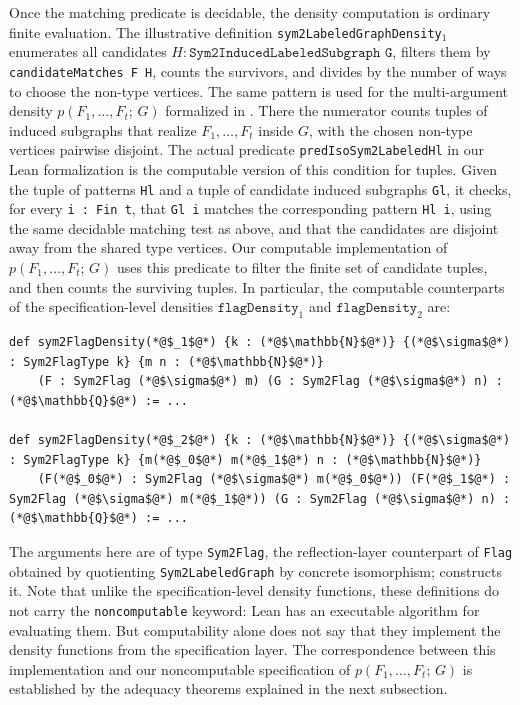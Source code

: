 \documentclass{article}
\newcommand{\den}[2]{p(#1;\,#2)}
\newcommand{\lean}[1]{\texttt{#1}}
\begin{document}
Once the matching predicate is decidable, the density computation is ordinary
finite evaluation.  The illustrative definition
\lean{sym2LabeledGraphDensity}$_1$
enumerates all candidates \(H : \lean{Sym2InducedLabeledSubgraph G}\), filters
them by \lean{candidateMatches F H}, counts the survivors, and divides by the
number of ways to choose the non-type vertices.  The same pattern is used for
the multi-argument density \(\den{F_1,\ldots,F_t}{G}\) formalized in
.  There the numerator counts tuples of
induced subgraphs that realize \(F_1,\ldots,F_t\) inside \(G\), with the
chosen non-type vertices pairwise disjoint.  The actual predicate
\lean{predIsoSym2LabeledHl} in our Lean formalization is the computable version of this
condition for tuples.  Given the tuple of patterns \lean{Hl}
and a tuple of candidate induced subgraphs \lean{Gl}, it checks, for every
\lean{i : Fin t}, that \lean{Gl i} matches the corresponding pattern
\lean{Hl i}, using the same decidable matching test as above, and that the
candidates are disjoint away from the shared type vertices.  Our
computable implementation of \(\den{F_1,\ldots,F_t}{G}\) uses this
predicate to filter the finite set of candidate tuples, and then counts the
surviving tuples.  In particular, the computable counterparts
of the specification-level densities \(\mathtt{flagDensity}_1\) and
\(\mathtt{flagDensity}_2\) are:
\begin{lstlisting}
def sym2FlagDensity(*@$_1$@*) {k : (*@$\mathbb{N}$@*)} {(*@$\sigma$@*) : Sym2FlagType k} {m n : (*@$\mathbb{N}$@*)}
    (F : Sym2Flag (*@$\sigma$@*) m) (G : Sym2Flag (*@$\sigma$@*) n) : (*@$\mathbb{Q}$@*) := ...

def sym2FlagDensity(*@$_2$@*) {k : (*@$\mathbb{N}$@*)} {(*@$\sigma$@*) : Sym2FlagType k} {m(*@$_0$@*) m(*@$_1$@*) n : (*@$\mathbb{N}$@*)}
    (F(*@$_0$@*) : Sym2Flag (*@$\sigma$@*) m(*@$_0$@*)) (F(*@$_1$@*) : Sym2Flag (*@$\sigma$@*) m(*@$_1$@*)) (G : Sym2Flag (*@$\sigma$@*) n) : (*@$\mathbb{Q}$@*) := ...
\end{lstlisting}
The arguments here are of type \lean{Sym2Flag}, the reflection-layer counterpart
of \lean{Flag} obtained by quotienting \lean{Sym2LabeledGraph} by concrete
isomorphism;  constructs it.
Note that unlike the specification-level density functions, these definitions do not
carry the \lean{noncomputable} keyword: Lean has an executable algorithm for
evaluating them.  But computability alone does not say that they implement the
density functions from the specification layer.  The correspondence between
this implementation and our noncomputable specification of
\(\den{F_1,\ldots,F_t}{G}\) is established by the adequacy theorems explained
in the next subsection.
\end{document}
